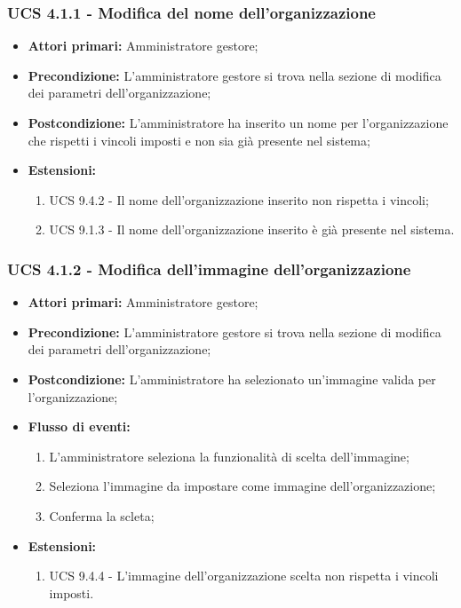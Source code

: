 \subsubsection{UCS 4.1.1 - Modifica del nome dell'organizzazione}%
\begin{itemize}
\item \textbf{Attori primari:} Amministratore gestore;
\item \textbf{Precondizione:} L'amministratore gestore si trova nella sezione di modifica dei parametri dell'organizzazione;
\item \textbf{Postcondizione:} L'amministratore ha inserito un nome per l'organizzazione che rispetti i vincoli imposti e non sia già presente nel sistema;
\item \textbf{Estensioni:}
\begin{enumerate}
    \item UCS 9.4.2 - Il nome dell'organizzazione inserito non rispetta i vincoli;
    \item UCS 9.1.3 - Il nome dell'organizzazione inserito è già presente nel sistema.
\end{enumerate}
\end{itemize}

\subsubsection{UCS 4.1.2 - Modifica dell'immagine dell'organizzazione}%
\begin{itemize}
\item \textbf{Attori primari:} Amministratore gestore;
\item \textbf{Precondizione:} L'amministratore gestore si trova nella sezione di modifica dei parametri dell'organizzazione;
\item \textbf{Postcondizione:} L'amministratore ha selezionato un'immagine valida per l'organizzazione;
\item \textbf{Flusso di eventi:}
\begin{enumerate}
    \item L'amministratore seleziona la funzionalità di scelta dell'immagine;
    \item Seleziona l'immagine da impostare come immagine dell'organizzazione;
    \item Conferma la scleta;
\end{enumerate}
\item \textbf{Estensioni:}
\begin{enumerate}
    \item UCS 9.4.4 - L'immagine dell'organizzazione scelta non rispetta i vincoli imposti.
\end{enumerate}
\end{itemize}

